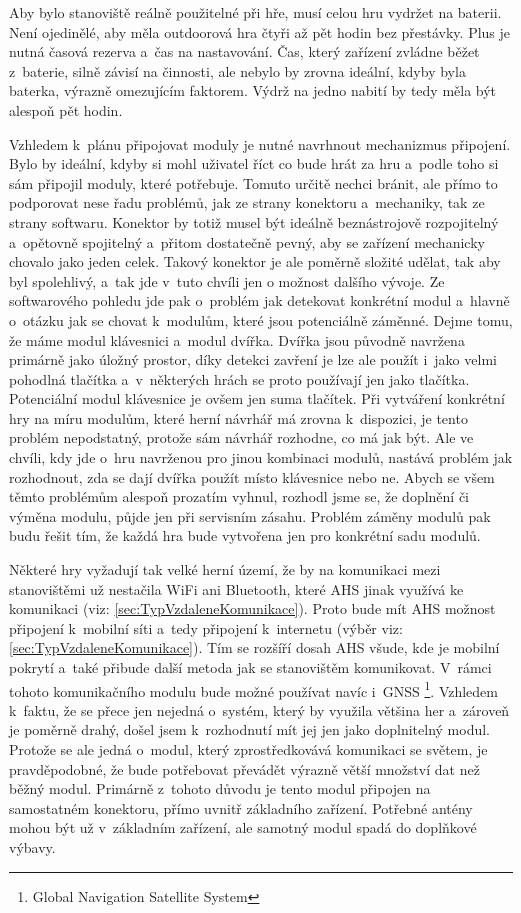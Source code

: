 Aby bylo stanoviště reálně použitelné při hře, musí celou hru vydržet na baterii.
Není ojedinělé, aby měla outdoorová hra čtyři až pět hodin bez přestávky.
Plus je nutná časová rezerva a~čas na nastavování.
Čas, který zařízení zvládne běžet z~baterie, silně závisí na činnosti, ale nebylo by zrovna ideální, kdyby byla baterka, výrazně omezujícím faktorem.
Výdrž na jedno nabití by tedy měla být alespoň pět hodin.

Vzhledem k~plánu připojovat moduly je nutné navrhnout mechanizmus připojení.
Bylo by ideální, kdyby si mohl uživatel říct co bude hrát za hru a~podle toho si sám připojil moduly, které potřebuje.
Tomuto určitě nechci bránit, ale přímo to podporovat nese řadu problémů, jak ze strany konektoru a~mechaniky, tak ze strany softwaru.
Konektor by totiž musel být ideálně beznástrojově rozpojitelný a~opětovně spojitelný a~přitom dostatečně pevný, aby se zařízení mechanicky chovalo jako jeden celek.
Takový konektor je ale poměrně složité udělat, tak aby byl spolehlivý, a~tak jde v~tuto chvíli jen o možnost dalšího vývoje.
Ze softwarového pohledu jde pak o~problém jak detekovat konkrétní modul a~hlavně o~otázku jak se chovat k~modulům, které jsou potenciálně záměnné.
Dejme tomu, že máme modul klávesnici a~modul dvířka.
Dvířka jsou původně navržena primárně jako úložný prostor, díky detekci zavření je lze ale použít i~jako velmi pohodlná tlačítka a~v~některých hrách se proto používají jen jako tlačítka.
Potenciální modul klávesnice je ovšem jen suma tlačítek.
Při vytváření konkrétní hry na míru modulům, které herní návrhář má zrovna k~dispozici, je tento problém nepodstatný, protože sám návrhář rozhodne, co má jak být.
Ale ve chvíli, kdy jde o~hru navrženou pro jinou kombinaci modulů, nastává problém jak rozhodnout, zda se dají dvířka použít místo klávesnice nebo ne.
Abych se všem těmto problémům alespoň prozatím vyhnul, rozhodl jsme se, že doplnění či výměna modulu, půjde jen při servisním zásahu.
Problém záměny modulů pak budu řešit tím, že každá hra bude vytvořena jen pro konkrétní sadu modulů.

Některé hry vyžadují tak velké herní území, že by na komunikaci mezi stanovištěmi už nestačila WiFi ani Bluetooth, které AHS jinak využívá ke komunikaci (viz: \ref{sec:TypVzdaleneKomunikace}).
Proto bude mít AHS možnost připojení k~mobilní síti a~tedy připojení k~internetu (výběr viz: \ref{sec:TypVzdaleneKomunikace}).
Tím se rozšíří dosah AHS všude, kde je mobilní pokrytí a~také přibude další metoda jak se stanovištěm komunikovat.
V~rámci tohoto komunikačního modulu bude možné používat navíc i~GNSS \footnote{Global Navigation Satellite System}.
Vzhledem k~faktu, že se přece jen nejedná o~systém, který by využila většina her a~zároveň je poměrně drahý, došel jsem k~rozhodnutí mít jej jen jako doplnitelný modul.
Protože se ale jedná o~modul, který zprostředkovává komunikaci se světem, je pravděpodobné, že bude potřebovat převádět výrazně větší množství dat než běžný modul.
Primárně z~tohoto důvodu je tento modul připojen na samostatném konektoru, přímo uvnitř základního zařízení.
Potřebné antény mohou být už v~základním zařízení, ale samotný modul spadá do doplňkové výbavy.

